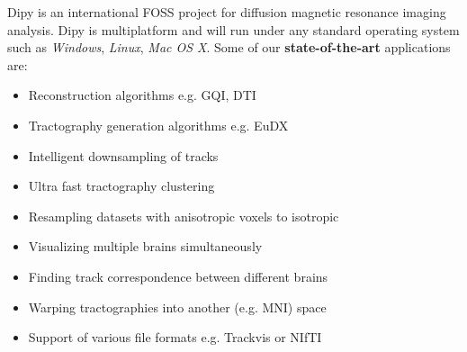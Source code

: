 \begin{multicols}{3}


Dipy is an international FOSS project for diffusion magnetic resonance
imaging analysis.  Dipy is multiplatform and will run under any
standard operating system such as \emph{Windows}, \emph{Linux},
\emph{Mac OS X}.  Some of our \textbf{state-of-the-art} applications
are:
\begin{itemize}[nolistsep,topsep=0em,leftmargin=1pc]
\item Reconstruction algorithms e.g. GQI, DTI
\item Tractography generation algorithms e.g. EuDX
\item Intelligent downsampling of tracks
\item Ultra fast tractography clustering
\item Resampling datasets with anisotropic voxels to isotropic
\item Visualizing multiple brains simultaneously
\item Finding track correspondence between different brains
\item Warping tractographies into another (e.g. MNI) space
\item Support of various  file formats e.g. Trackvis or NIfTI
\end{itemize}




\end{multicols}
